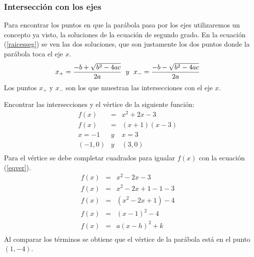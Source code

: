 \subsubsection{Intersección con los ejes}
Para encontrar los puntos en que la parábola pasa por los ejes utilizaremos un concepto ya visto, la soluciones de la ecuación de segundo grado. En la ecuación (\ref{raicesseg}) se ven las dos soluciones, que son justamente los dos puntos donde la parábola toca el eje $x$.\\ 
\begin{eqnarray}
x_{+}=\dfrac{-b+\sqrt{b^{2}-4ac}}{2a} \hspace{6px}y\hspace{6px}x_{-}=\dfrac{-b-\sqrt{b^{2}-4ac}}{2a}
\label{raicesseg}
\end{eqnarray}
Los puntos $x_{+}$ y $x_{-}$ son los que muestran las intersecciones con el eje $x$.

\begin{myexample}
Encontrar las intersecciones y el vértice de la siguiente función:
\begin{eqnarray*}
f(x)&=& x^{2}+2x-3\\
f(x)&=& (x+1)(x-3)\\
x=-1 &y& x=3\\
(-1,0) &y& (3,0)\\
\end{eqnarray*}
Para el vértice se debe completar cuadrados para igualar $f(x)$ con la ecuación (\ref{eqver}).
\begin{eqnarray*}
f(x)&=& x^{2}-2x-3\\
f(x)&=& x^{2}-2x+1-1-3\\
f(x)&=& (x^{2}-2x+1)-4\\
f(x)&=& (x-1)^{2}-4\\
f(x)&=& a(x-h)^{2}+k\\
\end{eqnarray*}
Al comparar los términos se obtiene que el vértice de la parábola está en el punto $(1,-4)$.
\end{myexample}

